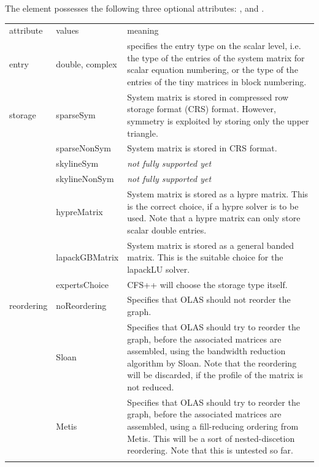 %
%
The  element possesses the following three optional attributes:
,  and .
%
%
\begin{center}
\begin{longtable}{llp{}}
\hline\noalign{\smallskip}
attribute & values & meaning \\
\noalign{\smallskip}\hline\noalign{\smallskip}
entry & double, complex & specifies the entry type on the scalar level, i.e.
                          the type of the entries of the system matrix for
                          scalar equation numbering, or the type of the entries
                          of the tiny matrices in block numbering.\\
\noalign{\smallskip}\hline\noalign{\smallskip}
storage & sparseSym      & System matrix is stored in compressed row storage
                           format (CRS) format. However, symmetry is exploited
                           by storing only the upper triangle.\\
        & sparseNonSym	 & System matrix is stored in CRS format.\\
        & skylineSym	 & \emph{not fully supported yet}\\
        & skylineNonSym	 & \emph{not fully supported yet}\\
        & hypreMatrix	 & System matrix is stored as a hypre matrix. This is
	                   the correct choice, if a hypre solver is to be used.
                           Note that a hypre matrix can only store scalar
                           double entries.\\
        & lapackGBMatrix & System matrix is stored as a general banded matrix.
                           This is the suitable choice for the lapackLU solver.
                           \\
        & expertsChoice  & CFS++ will choose the storage type itself.\\
\noalign{\smallskip}\hline\noalign{\smallskip}
reordering & noReordering  & Specifies that OLAS should not reorder the
                             graph.\\
           & Sloan         & Specifies that OLAS should try to reorder the
                             graph, before the associated matrices are
                             assembled, using the bandwidth reduction algorithm
                             by Sloan. Note that the reordering will be
                             discarded, if the profile of the matrix is not
                             reduced.\\
           & Metis         & Specifies that OLAS should try to reorder the
                             graph, before the associated matrices are
                             assembled, using a fill-reducing ordering from
                             Metis. This will be a sort of nested-discetion
                             reordering. Note that this is untested so far.\\
\noalign{\smallskip}\hline
\end{longtable}
\end{center}
